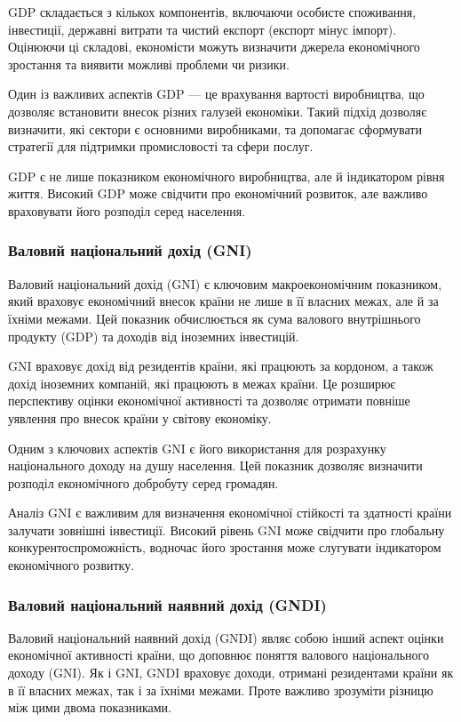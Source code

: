 GDP складається з кількох компонентів, включаючи особисте споживання, інвестиції, державні витрати та чистий експорт (експорт мінус імпорт). Оцінюючи ці складові, економісти можуть визначити джерела економічного зростання та виявити можливі проблеми чи ризики.

Один із важливих аспектів GDP --- це врахування вартості виробництва, що дозволяє встановити внесок різних галузей економіки. Такий підхід дозволяє визначити, які сектори є основними виробниками, та допомагає сформувати стратегії для підтримки промисловості та сфери послуг.

GDP є не лише показником економічного виробництва, але й індикатором рівня життя. Високий GDP може свідчити про економічний розвиток, але важливо враховувати його розподіл серед населення.

\subsubsection*{Валовий національний дохід (GNI)}

Валовий національний дохід (GNI) є ключовим макроекономічним показником, який враховує економічний внесок країни не лише в її власних межах, але й за їхніми межами. Цей показник обчислюється як сума валового внутрішнього продукту (GDP) та доходів від іноземних інвестицій.

GNI враховує дохід від резидентів країни, які працюють за кордоном, а також дохід іноземних компаній, які працюють в межах країни. Це розширює перспективу оцінки економічної активності та дозволяє отримати повніше уявлення про внесок країни у світову економіку.

Одним з ключових аспектів GNI є його використання для розрахунку національного доходу на душу населення. Цей показник дозволяє визначити розподіл економічного добробуту серед громадян.

Аналіз GNI є важливим для визначення економічної стійкості та здатності країни залучати зовнішні інвестиції. Високий рівень GNI може свідчити про глобальну конкурентоспроможність, водночас його зростання може слугувати індикатором економічного розвитку.

\subsubsection*{Валовий національний наявний дохід (GNDI)}

Валовий національний наявний дохід (GNDI) являє собою інший аспект оцінки економічної активності країни, що доповнює поняття валового національного доходу (GNI). Як і GNI, GNDI враховує доходи, отримані резидентами країни як в її власних межах, так і за їхніми межами. Проте важливо зрозуміти різницю між цими двома показниками.

